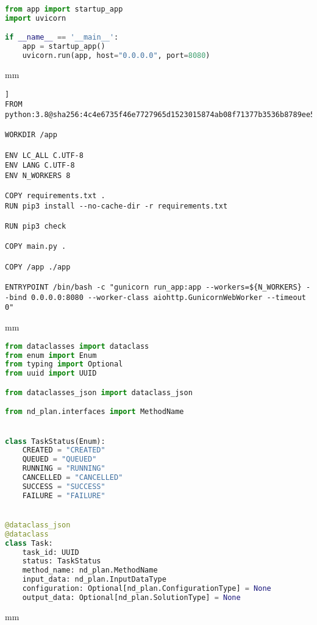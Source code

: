 \begin{lstlisting}[language=Python, caption=main.py, captionpos=b]
from app import startup_app
import uvicorn

if __name__ == '__main__':
    app = startup_app()
    uvicorn.run(app, host="0.0.0.0", port=8080)
\end{lstlisting}

 mm
\begin{lstlisting}[caption=Dockerfile, captionpos=b]]
FROM python:3.8@sha256:4c4e6735f46e7727965d1523015874ab08f71377b3536b8789ee5742fc737059

WORKDIR /app

ENV LC_ALL C.UTF-8
ENV LANG C.UTF-8
ENV N_WORKERS 8

COPY requirements.txt .
RUN pip3 install --no-cache-dir -r requirements.txt

RUN pip3 check

COPY main.py .

COPY /app ./app

ENTRYPOINT /bin/bash -c "gunicorn run_app:app --workers=${N_WORKERS} --bind 0.0.0.0:8080 --worker-class aiohttp.GunicornWebWorker --timeout 0"
\end{lstlisting}

 mm
\begin{lstlisting}[language=Python, caption=domain/model.py, captionpos=b]
from dataclasses import dataclass
from enum import Enum
from typing import Optional
from uuid import UUID

from dataclasses_json import dataclass_json

from nd_plan.interfaces import MethodName


class TaskStatus(Enum):
    CREATED = "CREATED"
    QUEUED = "QUEUED"
    RUNNING = "RUNNING"
    CANCELLED = "CANCELLED"
    SUCCESS = "SUCCESS"
    FAILURE = "FAILURE"


@dataclass_json
@dataclass
class Task:
    task_id: UUID
    status: TaskStatus
    method_name: nd_plan.MethodName
    input_data: nd_plan.InputDataType
    configuration: Optional[nd_plan.ConfigurationType] = None
    output_data: Optional[nd_plan.SolutionType] = None
\end{lstlisting}

 mm
